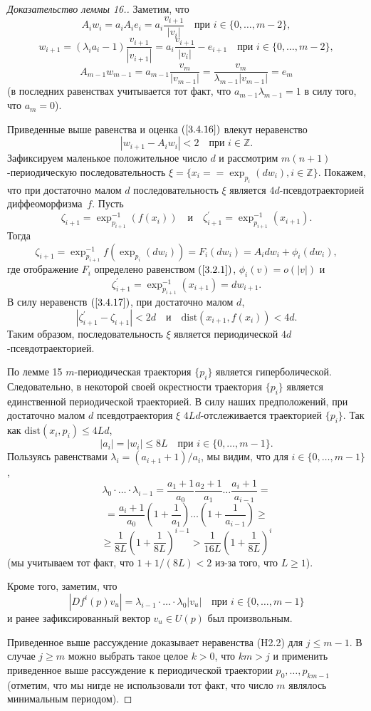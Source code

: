 \documentclass[12pt]{article}
\begin{document}
\begin{proof}[Доказательство леммы 16.]
Заметим, что
$$A_iw_i=a_iA_ie_i=a_i\frac{v_{i+1}}{|v_i|}\quad\textrm{при } i\in\{0,\ldots,m-2\},$$
$$w_{i+1}=(\lambda_ia_i-1)\frac{v_{i+1}}{|v_{i+1}|}=a_i\frac{v_{i+1}}{|v_i|}-e_{i+1}\quad\textrm{при } i\in\{0,\ldots,m-2\},$$
$$A_{m-1}w_{m-1}=a_{m-1}\frac{v_m}{|v_{m-1}|}=\frac{v_m}{\lambda_{m-1}|v_{m-1}|}=e_m$$
(в последних равенствах учитывается тот факт, что $a_{m-1}\lambda_{m-1}=1$ в силу того, что $a_m=0$).

Приведенные выше равенства и оценка $(\ref{3.4.16})$ влекут неравенство
\begin{equation}
\label{3.4.17}
|w_{i+1}-A_iw_i|<2\quad\mbox{при }i\in\mathbb{Z}.
\end{equation}
Зафиксируем маленькое положительное число $d$ и рассмотрим $m(n+1)$-периодическую последовательность $\xi=\{x_i=\allowbreak=\exp_{p_i}(dw_i), i\in\mathbb{Z}\}$. Покажем, что при достаточно малом $d$ последовательность $\xi$ является $4d$-псевдотраекторией диффеоморфизма~$f$. Пусть
$$\zeta_{i+1}=\exp^{-1}_{p_{i+1}}(f(x_i))\quad\mbox{и}\quad\zeta_{i+1}^{\prime}=\exp^{-1}_{p_{i+1}}(x_{i+1}).$$
Тогда
$$\zeta_{i+1}=\exp_{p_{i+1}}^{-1}f(\exp_{p_i}(dw_i))=F_i(dw_i)=A_idw_i+\phi_i(dw_i),$$
где отображение $F_i$ определено равенством $(\ref{3.2.1})$, $\phi_i(v)=o(|v|)$ и 
$$\zeta_{i+1}^{\prime}=\exp^{-1}_{p_{i+1}}(x_{i+1})=dw_{i+1}.$$
В силу неравенств $(\ref{3.4.17})$, при достаточно малом $d$,
$$|\zeta_{i+1}^{\prime}-\zeta_{i+1}|< 2d\quad\mbox{и}\quad\mbox{dist}(x_{i+1},f(x_i))< 4d.$$
Таким образом, последовательность $\xi$ является периодической $4d$-псевдотраекторией.

По лемме 15 $m$-периодическая траектория $\{p_i\}$ является гиперболической. Следовательно, в некоторой своей окрестности траектория $\{p_i\}$ является единственной периодической траекторией. В силу наших предположений, при достаточно малом $d$ псевдотраектория $\xi$ $4Ld$-отслеживается траекторией $\{p_i\}$. Так как $\mbox{dist}(x_i,p_i)\leq 4Ld$,
$$|a_i|=|w_i|\leq 8L\quad\mbox{при }i\in\{0,\ldots,m-1\}.$$
Пользуясь равенствами $\lambda_{i}=(a_{i+1}+1)/a_i$, мы видим, что для $i\in\{0,\ldots,m-1\}$,
$$\lambda_0\cdot\ldots\cdot\lambda_{i-1}=\frac{a_1+1}{a_0}\frac{a_2+1}{a_1}\ldots\frac{a_{i}+1}{a_{i-1}}=$$
$$=\frac{a_i+1}{a_0}\left(1+\frac{1}{a_1}\right)\ldots\left( 1+\frac{1}{a_{i-1}}\right)\geq$$
$$\geq\frac{1}{8L}\left(1+\frac{1}{8L}\right)^{i-1}>\frac{1}{16L}\left(1+\frac{1}{8L}\right)^i$$
(мы учитываем тот факт, что $1+1/(8L)<2$ из-за того, что $L\geq 1$).

Кроме того, заметим, что 
$$|Df^i(p)v_u|=\lambda_{i-1}\cdot\ldots\cdot\lambda_0|v_u|\quad\mbox{при }i\in\{0,\ldots,m-1\}$$
и ранее зафиксированный вектор $v_u\in U(p)$ был произвольным.

Приведенное выше рассуждение доказывает %
неравенства (H2.2) для $j\leq m-1$.
 В случае $j\geq m$ можно выбрать такое целое $k>0$, что $km>j$ и применить приведенное выше рассуждение к периодической траектории $p_0,\ldots,p_{km-1}$ (отметим, что мы нигде не использовали тот факт, что число $m$ являлось минимальным периодом). 
\end{proof}
\end{document}
